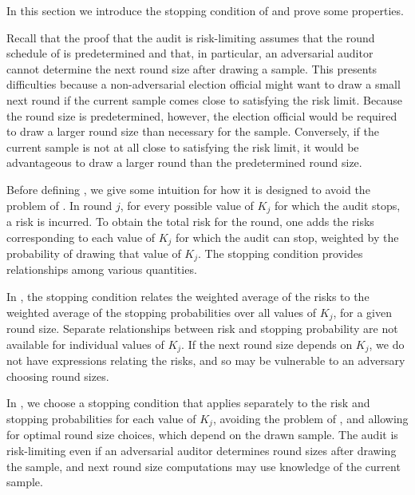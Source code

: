 In this section we introduce the stopping condition of \Providence and prove some properties.

Recall that the proof that the \Minerva audit is risk-limiting assumes that the round schedule of \Minerva is predetermined and that, in particular, an adversarial auditor cannot determine the next round size after drawing a sample. This presents difficulties because a non-adversarial election official might want to draw a small next round if the current sample comes close to satisfying the risk limit. Because the \Minerva round size is predetermined, however, the election official would be required to draw a larger round size than necessary for the sample. Conversely, if the current sample is not at all close to satisfying the risk limit, it would be advantageous to draw a larger round than the predetermined round size. 

Before defining \Providence, we give some intuition for how it is designed to avoid the problem of \Minerva.
In round $j$, for every possible value of $K_j$ for which the audit stops, a risk is incurred. To obtain the total risk for the round, one adds the risks corresponding to each value of $K_j$ for which the audit can stop, weighted by the probability of drawing that value of $K_j$. The stopping condition provides relationships among various quantities.

In \Minerva, the stopping condition relates the weighted average of the risks to the weighted average of the stopping probabilities over all values of $K_j$, for a given round size. Separate relationships between risk and stopping probability are not available for individual values of $K_j$. If the next round size depends on $K_j$, we do not have expressions relating the risks, and so \Minerva may be vulnerable to an adversary choosing round sizes. 

In \Providence, we choose a stopping condition that applies separately to the risk and stopping probabilities for each value of $K_j$, avoiding the problem of \Minerva, and allowing for optimal round size choices, which depend on the drawn sample. 
The \Providence audit is risk-limiting even if an adversarial auditor determines round sizes after drawing the sample, and next round size computations may use knowledge of the current sample. 

